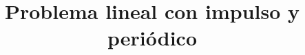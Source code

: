 \documentclass[a4paper,11pt]{book}
\theoremstyle{plain}
\theoremstyle{remark}
\begin{document}


\title{Problema lineal con impulso y periódico}
\author{ %
}
\date{}



    \maketitle

\begingroup%
\renewcommand{\thefootnote}{}%
\endgroup
\tableofcontents






 
 
 
 
 
 
 
 
 
\end{document}
